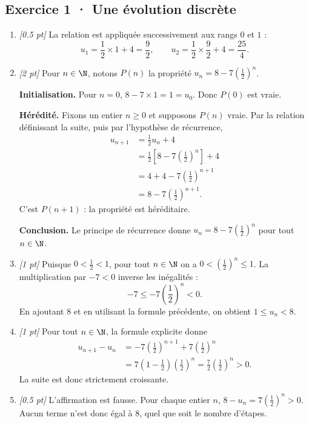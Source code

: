 \subsection*{Exercice 1 · Une évolution discrète}\begin{enumerate}

\item \textit{[\num{0,5} pt]} La relation est appliquée successivement aux rangs $0$ et $1$ :\[u_1=\frac{1}{2}\times 1+4=\frac{9}{2},\qquad u_2=\frac{1}{2}\times \frac{9}{2}+4=\frac{25}{4}.\]

\item \textit{[2 pt]} Pour $n\in\N$, notons $P(n)$ la propriété $u_n=8-7\left(\frac{1}{2}\right)^n$.
\par\smallskip\textbf{Initialisation.} Pour $n=0$, $8-7\times1=1=u_0$. Donc $P(0)$ est vraie.
\par\smallskip\textbf{Hérédité.} Fixons un entier $n\ge0$ et supposons $P(n)$ vraie. Par la relation définissant la suite, puis par l'hypothèse de récurrence,
\[\begin{aligned}u_{n+1}&=\frac{1}{2}u_n+4\\
&=\frac{1}{2}\left[8-7\left(\frac{1}{2}\right)^n\right]+4\\
&=4+4-7\left(\frac{1}{2}\right)^{n+1}\\
&=8-7\left(\frac{1}{2}\right)^{n+1}.
\end{aligned}\]
C'est $P(n+1)$ : la propriété est héréditaire.
\par\smallskip\textbf{Conclusion.} Le principe de récurrence donne $u_n=8-7\left(\frac{1}{2}\right)^n$ pour tout $n\in\N$.

\item \textit{[1 pt]} Puisque $0<\frac{1}{2}<1$, pour tout $n\in\N$ on a $0<(\frac{1}{2})^n\le1$. La multiplication par $-7<0$ inverse les inégalités :
\[-7\le-7(\frac{1}{2})^n<0.\]
En ajoutant $8$ et en utilisant la formule précédente, on obtient $1\le u_n<8$.

\item \textit{[1 pt]} Pour tout $n\in\N$, la formule explicite donne
\[\begin{aligned}u_{n+1}-u_n&=-7(\frac{1}{2})^{n+1}+7(\frac{1}{2})^n\\&=7(1-\frac{1}{2})(\frac{1}{2})^n=\frac{7}{2}(\frac{1}{2})^n>0.\end{aligned}\]
La suite est donc strictement croissante.

\item \textit{[\num{0,5} pt]} L'affirmation est fausse. Pour chaque entier $n$, $8-u_n=7(\frac{1}{2})^n>0$. Aucun terme n'est donc égal à $8$, quel que soit le nombre d'étapes.

\end{enumerate}


